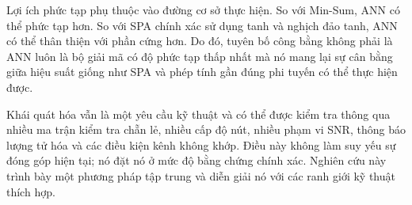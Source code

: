 Lợi ích phức tạp phụ thuộc vào đường cơ sở thực hiện. So với Min-Sum, ANN có thể phức tạp hơn. So với SPA chính xác sử dụng tanh và nghịch đảo tanh, ANN có thể thân thiện với phần cứng hơn. Do đó, tuyên bố công bằng không phải là ANN luôn là bộ giải mã có độ phức tạp thấp nhất mà nó mang lại sự cân bằng giữa hiệu suất giống như SPA và phép tính gần đúng phi tuyến có thể thực hiện được.

Khái quát hóa vẫn là một yêu cầu kỹ thuật và có thể được kiểm tra thông qua nhiều ma trận kiểm tra chẵn lẻ, nhiều cấp độ nút, nhiều phạm vi SNR, thông báo lượng tử hóa và các điều kiện kênh không khớp. Điều này không làm suy yếu sự đóng góp hiện tại; nó đặt nó ở mức độ bằng chứng chính xác. Nghiên cứu này trình bày một phương pháp tập trung và diễn giải nó với các ranh giới kỹ thuật~ thích hợp.
